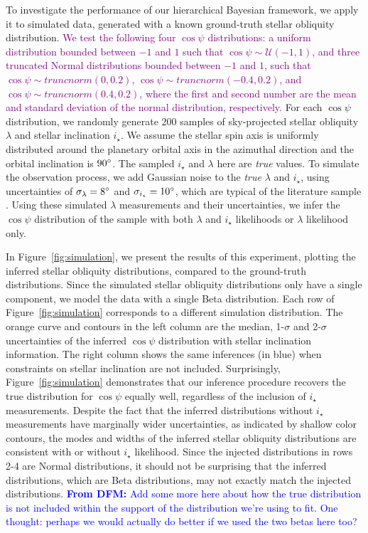 \documentclass[twocolumn,times]{aastex631}
\newcommand{\dfm}[1]{\textcolor{blue}{\textbf{From DFM:} #1}}
\newcommand{\edits}[1]{\textcolor{purple}{#1}}
\begin{document}
To investigate the performance of our hierarchical Bayesian framework, we apply it to simulated data, generated with a known ground-truth stellar obliquity distribution.
\edits{We test the following four $\cos{\psi}$ distributions: a uniform distribution bounded between $-1$ and $1$ such that $\cos{\psi} \sim \mathcal{U}(-1,1)$, and three truncated Normal distributions bounded between $-1$ and $1$, such that $\cos{\psi} \sim \textit{truncnorm}(0, 0.2)$, $\cos{\psi} \sim \textit{truncnorm}(-0.4, 0.2)$, and $\cos{\psi} \sim \textit{truncnorm}(0.4, 0.2)$, where the first and second number are the mean and standard deviation of the normal distribution, respectively.}
For each $\cos{\psi}$ distribution, we randomly generate 200 samples of sky-projected stellar obliquity $\lambda$ and stellar inclination $i_\star$. We assume the stellar spin axis is uniformly distributed around the planetary orbital axis in the azimuthal direction and the orbital inclination is $90\mbox{$^\circ$}$.
The sampled $i_\star$ and $\lambda$ here are \emph{true} values. 
To simulate the observation process, we add Gaussian noise to the \emph{true} $\lambda$ and $i_\star$, using uncertainties of $\sigma_{\lambda} = 8\mbox{$^\circ$}$ and $\sigma_{i_\star} = 10\mbox{$^\circ$}$, which are typical of the literature sample \cite{Albrecht22}.
Using these simulated $\lambda$ measurements and their uncertainties, we infer the $\cos{\psi}$ distribution of the sample with both $\lambda$ and $i_\star$ likelihoods or $\lambda$ likelihood only.

In Figure~\ref{fig:simulation}, we present the results of this experiment, plotting the inferred stellar obliquity distributions, compared to the ground-truth distributions.
Since the simulated stellar obliquity distributions only have a single component, we model the data with a single Beta distribution.
Each row of Figure~\ref{fig:simulation} corresponds to a different simulation distribution. The orange curve and contours in the left column are the median, 1-$\sigma$ and 2-$\sigma$ uncertainties of the inferred $\cos{\psi}$ distribution with stellar inclination information.
The right column shows the same inferences (in blue) when constraints on stellar inclination are not included.
Surprisingly, Figure~\ref{fig:simulation} demonstrates that our inference procedure recovers the true distribution for $\cos{\psi}$ equally well, regardless of the inclusion of $i_\star$ measurements.
Despite the fact that the inferred distributions without $i_\star$ measurements have marginally wider uncertainties, as indicated by shallow color contours, the modes and widths of the inferred stellar obliquity distributions are consistent with or without $i_\star$ likelihood.
Since the injected distributions in rows 2-4 are Normal distributions, it should not be surprising that the inferred distributions, which are Beta distributions, may not exactly match the injected distributions.
\dfm{Add some more here about how the true distribution is not included within the support of the distribution we're using to fit. One thought: perhaps we would actually do better if we used the two betas here too?}
\end{document}
